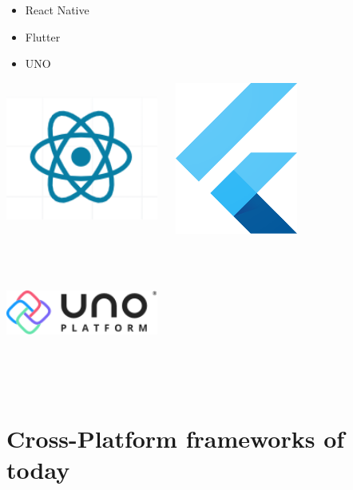 \documentclass[14pt]{extarticle}
\begin{document}
\begin{itemize}
    \item React Native
    \item Flutter
    \item UNO
\end{itemize}

\vfil

\begin{center}
    \includegraphics[width=50mm,height=50mm,keepaspectratio]{react native logo.png}
    \hfil
    \includegraphics[width=50mm,height=50mm,keepaspectratio]{flutter-icon.png}
    \hfil
    \vfil
    \includegraphics[width=50mm,height=50mm,keepaspectratio]{uno-platform-logo.png}
\end{center}

\newpage
\section{Cross-Platform frameworks of today}
\end{document}
